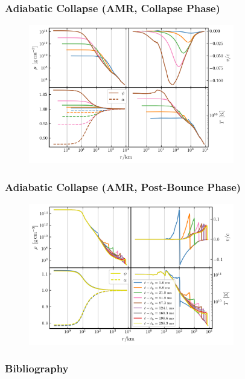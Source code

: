 \documentclass{beamer}
\begin{document}
\begin{frame}
\frametitle{Adiabatic Collapse (AMR, Collapse Phase)}

  \begin{figure}[htb!]
    \centering
    \includegraphics[width=0.8\textwidth]{fig.collapse.png}
  \end{figure}

\end{frame}

\begin{frame}
\frametitle{Adiabatic Collapse (AMR, Post-Bounce Phase)}

  \begin{figure}[htb!]
    \centering
    \includegraphics[width=0.8\textwidth]{fig.postBounce.png}
  \end{figure}

\end{frame}

\begin{frame}
\frametitle{Bibliography}

  \Fontvi
  

\end{frame}
\end{document}
